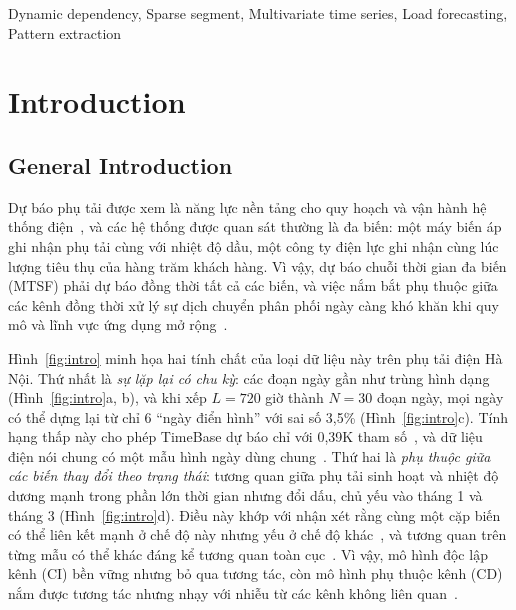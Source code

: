 \documentclass[conference]{IEEEtran}
\begin{document}
\begin{IEEEkeywords}
Dynamic dependency, Sparse segment, Multivariate time series, Load forecasting, Pattern extraction
\end{IEEEkeywords}

\section{Introduction}

\subsection{General Introduction}

Dự báo phụ tải được xem là năng lực nền tảng cho quy hoạch và vận hành hệ thống điện~\cite{Hong2016Probabilistic}, và các
hệ thống được quan sát thường là đa biến: một máy biến áp ghi nhận phụ tải cùng với nhiệt độ dầu, một công ty điện lực
ghi nhận cùng lúc lượng tiêu thụ của hàng trăm khách hàng. Vì vậy, dự báo chuỗi thời gian đa biến (MTSF) phải dự báo
đồng thời tất cả các biến, và việc nắm bắt phụ thuộc giữa các kênh đồng thời xử lý sự dịch chuyển phân phối ngày càng
khó khăn khi quy mô và lĩnh vực ứng dụng mở rộng~\cite{Kim2025Survey}.

Hình~\ref{fig:intro} minh họa hai tính chất của loại dữ liệu này trên phụ tải điện Hà Nội. Thứ nhất là \emph{sự lặp lại
có chu kỳ}: các đoạn ngày gần như trùng hình dạng (Hình~\ref{fig:intro}a, b), và khi xếp $L=720$ giờ thành $N=30$ đoạn
ngày, mọi ngày có thể dựng lại từ chỉ 6 ``ngày điển hình'' với sai số 3,5\% (Hình~\ref{fig:intro}c). Tính hạng thấp này
cho phép TimeBase dự báo chỉ
với 0,39K tham số~\cite{Huang2025TimeBase}, và dữ liệu điện nói chung có một mẫu hình ngày dùng chung~\cite{Lin2024CycleNet}.
Thứ hai là \emph{phụ thuộc giữa các biến thay đổi theo trạng thái}: tương quan giữa phụ tải sinh hoạt và nhiệt độ dương
mạnh trong phần lớn thời gian nhưng đổi dấu, chủ yếu vào tháng 1 và tháng 3 (Hình~\ref{fig:intro}d). Điều này khớp với
nhận xét rằng cùng một cặp biến có thể liên kết mạnh ở chế độ này nhưng yếu ở chế độ khác~\cite{Zhang2026MSFLOW}, và
tương quan trên từng mẫu có thể khác đáng kể tương quan toàn cục~\cite{Lin2025TQNet}. Vì vậy, mô hình độc lập kênh (CI)
bền vững nhưng bỏ qua tương tác, còn mô hình phụ thuộc kênh (CD) nắm được tương tác nhưng nhạy với nhiễu từ các kênh
không liên quan~\cite{Han2024Capacity,Qiu2025DUET}.
\end{document}
